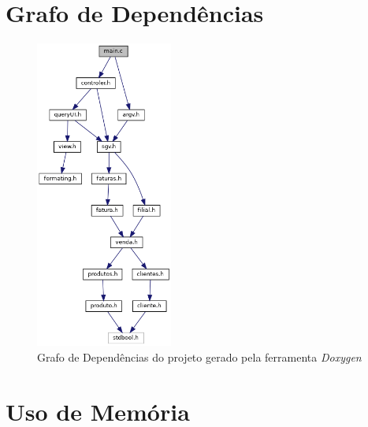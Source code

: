 \documentclass[a4paper]{report}
\begin{document}
\chapter{Grafo de Dependências}
\begin{figure}[H]
    \begin{center}
        \includegraphics[width=0.4\textwidth]{dependency.png}\par
        \caption{Grafo de Dependências do projeto gerado pela ferramenta \textit{Doxygen}}
    \end{center}
\end{figure}

\chapter{Uso de Memória}
\end{document}
